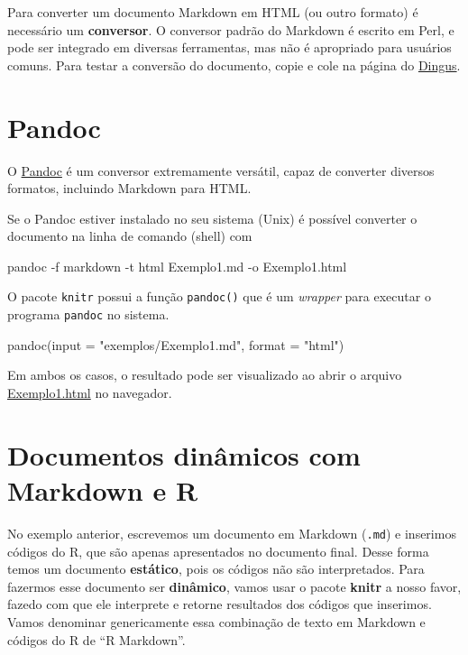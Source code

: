 \documentclass[
  10pt,
  a4paper]{book}
\newenvironment{Shaded}{\begin{snugshade}}{\end{snugshade}}
\newcommand{\AttributeTok}[1]{\textcolor[rgb]{0.77,0.63,0.00}{#1}}
\newcommand{\ExtensionTok}[1]{#1}
\newcommand{\FunctionTok}[1]{\textcolor[rgb]{0.00,0.00,0.00}{#1}}
\newcommand{\NormalTok}[1]{#1}
\newcommand{\StringTok}[1]{\textcolor[rgb]{0.31,0.60,0.02}{#1}}
\begin{document}
Para converter um documento Markdown em HTML (ou outro formato) é
necessário um \textbf{conversor}. O conversor padrão do Markdown é escrito em
Perl, e pode ser integrado em diversas ferramentas, mas não é apropriado
para usuários comuns. Para testar a conversão do documento, copie e cole
na página do \href{http://daringfireball.net/projects/markdown/dingus}{Dingus}.

\hypertarget{pandoc}{%
\section{Pandoc}\label{pandoc}}

O \href{http://pandoc.org/}{Pandoc} é um conversor extremamente versátil, capaz de converter
diversos formatos, incluindo Markdown para HTML.

Se o Pandoc estiver instalado no seu sistema (Unix) é possível
converter o documento na linha de comando (shell) com

\begin{Shaded}
\begin{Highlighting}[]
\ExtensionTok{pandoc} \AttributeTok{{-}f}\NormalTok{ markdown }\AttributeTok{{-}t}\NormalTok{ html Exemplo1.md }\AttributeTok{{-}o}\NormalTok{ Exemplo1.html}
\end{Highlighting}
\end{Shaded}

O pacote \texttt{knitr} possui a função \texttt{pandoc()} que é um \emph{wrapper} para
executar o programa \texttt{pandoc} no sistema.

\begin{Shaded}
\begin{Highlighting}[]
\FunctionTok{pandoc}\NormalTok{(}\AttributeTok{input =} \StringTok{"exemplos/Exemplo1.md"}\NormalTok{, }\AttributeTok{format =} \StringTok{"html"}\NormalTok{)}
\end{Highlighting}
\end{Shaded}

Em ambos os casos, o resultado pode ser visualizado ao abrir o arquivo
\href{exemplos/Exemplo1.html}{Exemplo1.html} no navegador.

\hypertarget{documentos-dinuxe2micos-com-markdown-e-r}{%
\section{Documentos dinâmicos com Markdown e R}\label{documentos-dinuxe2micos-com-markdown-e-r}}

No exemplo anterior, escrevemos um documento em Markdown (\texttt{.md}) e
inserimos códigos do R, que são apenas apresentados no documento final.
Desse forma temos um documento \textbf{estático}, pois os códigos não são
interpretados. Para fazermos esse documento ser \textbf{dinâmico}, vamos usar
o pacote \textbf{knitr} a nosso favor, fazedo com que ele interprete e
retorne resultados dos códigos que inserimos. Vamos denominar
genericamente essa combinação de texto em Markdown e códigos do R de ``R
Markdown''.
\end{document}
